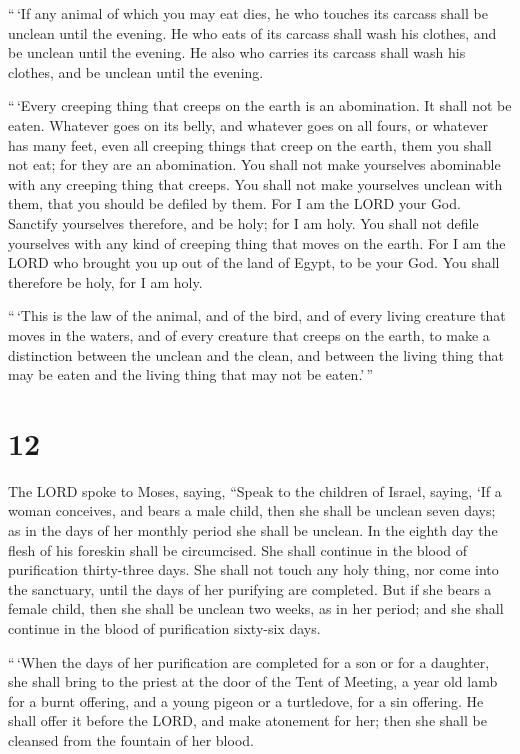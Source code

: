  ``\,`If any animal of which you may eat dies, he who
touches its carcass shall be unclean until the evening.  He
who eats of its carcass shall wash his clothes, and be unclean until the
evening. He also who carries its carcass shall wash his clothes, and be
unclean until the evening.

 ``\,`Every creeping thing that creeps on the earth is an
abomination. It shall not be eaten.  Whatever goes on its
belly, and whatever goes on all fours, or whatever has many feet, even
all creeping things that creep on the earth, them you shall not eat; for
they are an abomination.  You shall not make yourselves
abominable with any creeping thing that creeps. You shall not make
yourselves unclean with them, that you should be defiled by them.
 For I am the LORD your God. Sanctify yourselves therefore,
and be holy; for I am holy. You shall not defile yourselves with any
kind of creeping thing that moves on the earth.  For I am
the LORD who brought you up out of the land of Egypt, to be your God.
You shall therefore be holy, for I am holy.

 ``\,`This is the law of the animal, and of the bird, and
of every living creature that moves in the waters, and of every creature
that creeps on the earth,  to make a distinction between
the unclean and the clean, and between the living thing that may be
eaten and the living thing that may not be eaten.'\,''

\hypertarget{section-11}{%
\section{12}\label{section-11}}

 The LORD spoke to Moses, saying,  ``Speak to
the children of Israel, saying, `If a woman conceives, and bears a male
child, then she shall be unclean seven days; as in the days of her
monthly period she shall be unclean.  In the eighth day the
flesh of his foreskin shall be circumcised.  She shall
continue in the blood of purification thirty-three days. She shall not
touch any holy thing, nor come into the sanctuary, until the days of her
purifying are completed.  But if she bears a female child,
then she shall be unclean two weeks, as in her period; and she shall
continue in the blood of purification sixty-six days.

 ``\,`When the days of her purification are completed for a
son or for a daughter, she shall bring to the priest at the door of the
Tent of Meeting, a year old lamb for a burnt offering, and a young
pigeon or a turtledove, for a sin offering.  He shall offer
it before the LORD, and make atonement for her; then she shall be
cleansed from the fountain of her blood.

